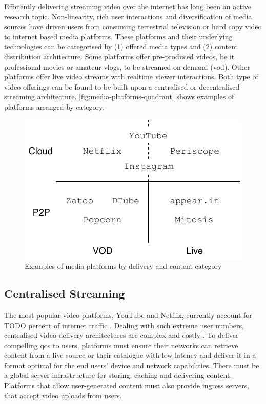 Efficiently delivering streaming video over the internet has long been an active research topic. Non-linearity, rich user interactions and diversification of media sources have driven users from consuming terrestrial television or hard copy video to internet based media platforms.
These platforms and their underlying technologies can be categorised by (1) offered media types and (2) content distribution architecture. Some platforms offer pre-produced videos, be it professional movies or amateur vlogs, to be streamed on demand (\gls{vod}). Other platforms offer live video streams with realtime viewer interactions.
Both type of video offerings can be found to be built upon a centralised or decentralised streaming architecture. \vref{fig:media-platforms-quadrant} shows examples of platforms arranged by category.

\begin{figure}
\centering
\includegraphics[width=.5\textwidth]{graphics/media-platforms-quadrant.pdf}
\caption{Examples of media platforms by delivery and content category}
\label{fig:media-platforms-quadrant}
\end{figure}

\subsection{Centralised Streaming}

The most popular video platforms, YouTube and Netflix, currently account for TODO percent of internet traffic \cite[p 18]{phenomena-report}. Dealing with such extreme user numbers, centralised video delivery architectures are complex and costly \cite{market-driven-p2p}. To deliver compelling \gls{qos} to users, platforms must ensure their networks can retrieve content from a live source or their catalogue with low latency and deliver it in a format optimal for the end users' device and network capabilities. There must be a global server infrastructure for storing, caching and delivering content. Platforms that allow user-generated content must also provide ingress servers, that accept video uploads from users.

